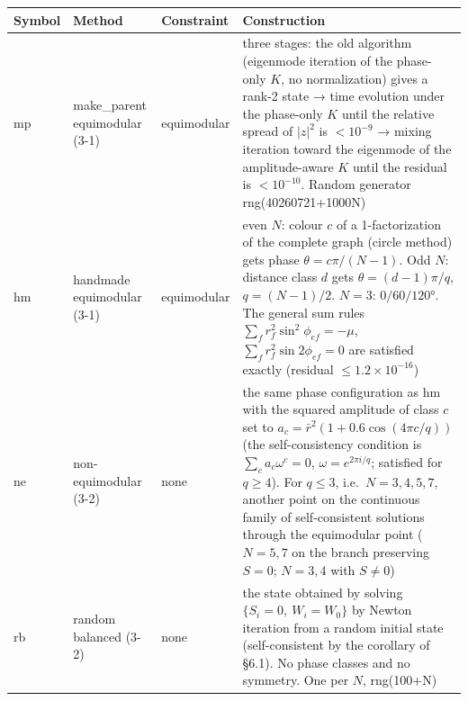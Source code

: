 \documentclass[
  10pt,
  a4paper,
]{article}
\newcounter{none} %
\begin{document}
{\def\LTcaptype{none} %
\begin{longtable}[]{@{}
  >{\raggedright\arraybackslash}p{}
  >{\raggedright\arraybackslash}p{}
  >{\raggedright\arraybackslash}p{}
  >{\raggedright\arraybackslash}p{}@{}}
\toprule\noalign{}
\begin{minipage}[b]{\linewidth}\raggedright
Symbol
\end{minipage} & \begin{minipage}[b]{\linewidth}\raggedright
Method
\end{minipage} & \begin{minipage}[b]{\linewidth}\raggedright
Constraint
\end{minipage} & \begin{minipage}[b]{\linewidth}\raggedright
Construction
\end{minipage} \\
\midrule\noalign{}
\endhead
\bottomrule\noalign{}
\endlastfoot
mp & make\_parent equimodular (3-1) & equimodular & three stages: the
old algorithm (eigenmode iteration of the phase-only \(K\), no
normalization) gives a rank-2 state → time evolution under the
phase-only \(K\) until the relative spread of \(|z|^2\) is \(<10^{-9}\)
→ mixing iteration toward the eigenmode of the amplitude-aware \(K\)
until the residual is \(<10^{-10}\). Random generator
rng(40260721+1000N) \\
hm & handmade equimodular (3-1) & equimodular & even \(N\): colour \(c\)
of a 1-factorization of the complete graph (circle method) gets phase
\(\theta=c\pi/(N-1)\). Odd \(N\): distance class \(d\) gets
\(\theta=(d-1)\pi/q\), \(q=(N-1)/2\). \(N=3\): \(0/60/120°\). The
general sum rules \(\sum_f r_f^2\sin^2\phi_{ef}=-\mu\),
\(\sum_f r_f^2\sin2\phi_{ef}=0\) are satisfied exactly (residual
\(\le1.2\times10^{-16}\)) \\
ne & non-equimodular (3-2) & none & the same phase configuration as hm
with the squared amplitude of class \(c\) set to
\(a_c=\bar r^2(1+0.6\cos(4\pi c/q))\) (the self-consistency condition is
\(\sum_ca_c\omega^c=0\), \(\omega=e^{2\pi i/q}\); satisfied for
\(q\ge4\)). For \(q\le3\), i.e.~\(N=3,4,5,7\), another point on the
continuous family of self-consistent solutions through the equimodular
point (\(N=5,7\) on the branch preserving \(S=0\); \(N=3,4\) with
\(S\ne0\)) \\
rb & random balanced (3-2) & none & the state obtained by solving
\(\{S_i=0,\ W_i=W_0\}\) by Newton iteration from a random initial state
(self-consistent by the corollary of §6.1). No phase classes and no
symmetry. One per \(N\), rng(100+N) \\
\end{longtable}
}
\end{document}
